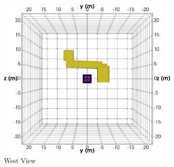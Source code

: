 \documentclass[preprint,authoryear,12pt]{elsarticle}
\begin{document}
\begin{figure}[htp]{}
   \begin{center}
      \begin{subfigure}{0.54\linewidth}
         \includegraphics[height=\ht0,keepaspectratio]{./figures/Fig12a.png}
         \caption{West View}
         \label{fig:StraightTunnel_SynthMosaic2_TrueMod_West}
      \end{subfigure}
      \hspace{-2.5cm}
      \qquad
      \begin{subfigure}{0.54\linewidth}

\end{subfigure}
\end{center}
\end{figure}
\end{document}
